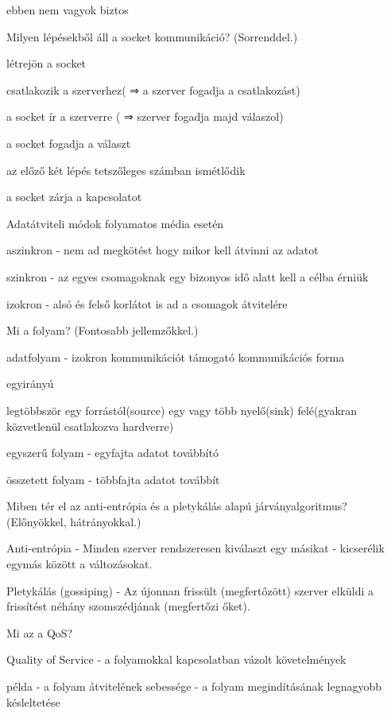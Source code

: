 \documentclass[12pt]{article}
\begin{document}
\begin{description}
        ebben nem vagyok biztos
    \item  Milyen lépésekből áll a socket kommunikáció? (Sorrenddel.)
    \item létrejön a socket
    \item csatlakozik a szerverhez( ⇒ a szerver fogadja a csatlakozást)
    \item a socket ír a szerverre ( ⇒ szerver fogadja majd válaszol)
    \item a socket fogadja a választ
    \item az előző két lépés tetszőleges számban ismétlődik
    \item a socket zárja a kapcsolatot
    \item  Adatátviteli módok folyamatos média esetén
    \item aszinkron
        - nem ad megkötést hogy mikor kell átvinni az adatot
    \item szinkron
        - az egyes csomagoknak egy bizonyos idő alatt kell a célba érniük
    \item izokron 
        - alsó és felső korlátot is ad a csomagok átvitelére
    \item  Mi a folyam? (Fontosabb jellemzőkkel.)
    \item adatfolyam
        - izokron kommunikációt támogató kommunikációs forma
    \item egyirányú
    \item legtöbbször egy forrástól(source) egy vagy több nyelő(sink) felé(gyakran közvetlenül csatlakozva hardverre)
    \item egyszerű folyam
        - egyfajta adatot továbbító
    \item összetett folyam
        - többfajta adatot továbbít
    \item  Miben tér el az anti-entrópia és a pletykálás alapú járványalgoritmus? (Előnyökkel, hátrányokkal.)
    \item Anti-entrópia
        - Minden szerver rendszeresen kiválaszt egy másikat
        - kicserélik egymás között a változásokat.
    \item Pletykálás (gossiping)
        - Az újonnan frissült (megfertőzött) szerver elküldi a frissítést néhány szomszédjának (megfertőzi őket).
    \item  Mi az a QoS?
    \item Quality of Service 
        - a folyamokkal kapcsolatban vázolt követelmények
    \item példa
        - a folyam átvitelének sebessége
        - a folyam megindításának legnagyobb késleltetése

\end{description}
\end{document}
